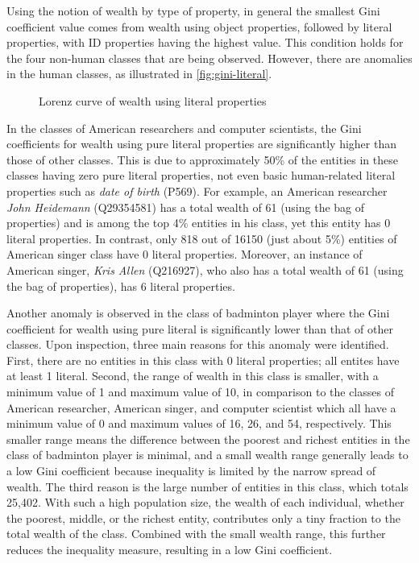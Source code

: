 Using the notion of wealth by type of property, in general the smallest Gini coefficient value comes from wealth using object properties, followed by literal properties, with ID properties having the highest value. This condition holds for the four non-human classes that are being observed. However, there are anomalies in the human classes, as illustrated in \autoref{fig:gini-literal}.

\begin{figure}[!htbp]
    \centering
    \caption{Lorenz curve of wealth using literal properties} \label{fig:gini-literal}
\end{figure}

In the classes of American researchers and computer scientists, the Gini coefficients for wealth using pure literal properties are significantly higher than those of other classes. This is due to approximately 50\% of the entities in these classes having zero pure literal properties, not even basic human-related literal properties such as \textit{date of birth} (P569). For example, an American researcher \textit{John Heidemann} (Q29354581) has a total wealth of 61 (using the bag of properties) and is among the top 4\% entities in his class, yet this entity has 0 literal properties. In contrast, only 818 out of 16150 (just about 5\%) entities of American singer class have 0 literal properties. Moreover, an instance of American singer, \textit{Kris Allen} (Q216927), who also has a total wealth of 61 (using the bag of properties), has 6 literal properties.

Another anomaly is observed in the class of badminton player where the Gini coefficient for wealth using pure literal is significantly lower than that of other classes. Upon inspection, three main reasons for this anomaly were identified. First, there are no entities in this class with 0 literal properties; all entites have at least 1 literal. Second, the range of wealth in this class is smaller, with a minimum value of 1 and maximum value of 10, in comparison to the classes of American researcher, American singer, and computer scientist which all have a minimum value of 0 and maximum values of 16, 26, and 54, respectively. This smaller range means the difference between the poorest and richest entities in the class of badminton player is minimal, and a small wealth range generally leads to a low Gini coefficient because inequality is limited by the narrow spread of wealth. The third reason is the large number of entities in this class, which totals 25,402. With such a high population size, the wealth of each individual, whether the poorest, middle, or the richest entity, contributes only a tiny fraction to the total wealth of the class. Combined with the small wealth range, this further reduces the inequality measure, resulting in a low Gini coefficient.

